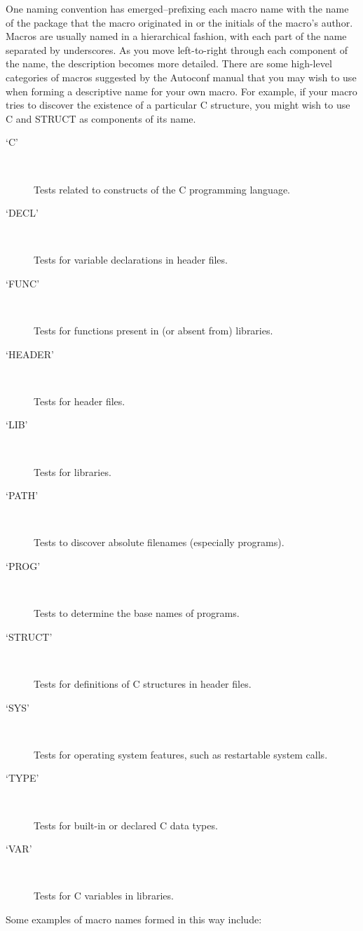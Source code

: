 One naming convention has emerged--prefixing each macro name with the name of the package that the macro originated in or the initials of the macro's author. Macros are usually named in a hierarchical fashion, with each part of the name separated by underscores. As you move left-to-right through each component of the name, the description becomes more detailed. There are some high-level categories of macros suggested by the Autoconf manual that you may wish to use when forming a descriptive name for your own macro. For example, if your macro tries to discover the existence of a particular C structure, you might wish to use C and STRUCT as components of its name. 

\begin{description}
\item[`C']
\

    Tests related to constructs of the C programming language. 
\item[`DECL']
\

    Tests for variable declarations in header files. 
\item[`FUNC']
\

    Tests for functions present in (or absent from) libraries. 
\item[`HEADER']
\

    Tests for header files. 
\item[`LIB']
\

    Tests for libraries. 
\item[`PATH']
\

    Tests to discover absolute filenames (especially programs). 
\item[`PROG']
\

    Tests to determine the base names of programs. 
\item[`STRUCT']
\

    Tests for definitions of C structures in header files. 
\item[`SYS']
\

    Tests for operating system features, such as restartable system calls. 
\item[`TYPE']
\

    Tests for built-in or declared C data types. 
\item[`VAR']
\

    Tests for C variables in libraries.
\end{description}

Some examples of macro names formed in this way include:

